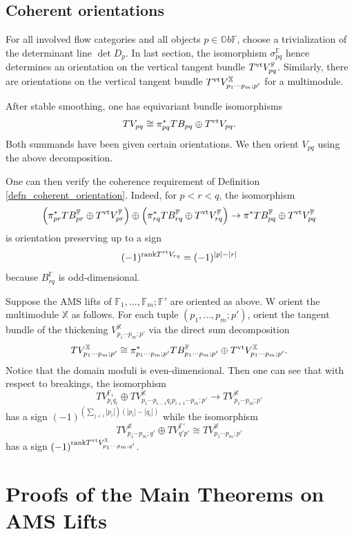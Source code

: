 \documentclass[reqno, 10pt]{amsart}
\numberwithin{equation}{section}
\numberwithin{equation}{section}
\theoremstyle{definition}
\theoremstyle{remark}
\newcommand{\beqn}{\begin{equation*}}
\newcommand{\eeqn}{\end{equation*}}
\newcommand{\mb}{\mathbb}
\begin{document}
\subsection{Coherent orientations}

For all involved flow categories and all objects $p \in {\mb Ob}{\mb F}$, choose a trivialization of the determinant line $\det D_p$. In last section, the isomorphism $\sigma_{pq}^{\mb F}$ hence determines an orientation on the vertical tangent bundle $T^{\rm vt} V_{pq}^{\mb F}$. Similarly, there are orientations on the vertical tangent bundle $T^{\rm vt} V_{p_1\cdots p_m; p'}^{\mb X}$ for a multimodule. 

After stable smoothing, one has equivariant bundle isomorphisms
\beqn
TV_{pq} \cong \pi_{pq}^* TB_{pq} \oplus T^{\rm vt} V_{pq}.
\eeqn
Both summands have been given certain orientations. We then orient $V_{pq}$ using the above decomposition. 


One can then verify the coherence requirement of Definition \ref{defn_coherent_orientation}. Indeed, for $p<r<q$, the isomorphism
\beqn
\Big( \pi_{pr}^* TB_{pr}^{\mb F} \oplus T^{\rm vt} V_{pr}^{\mb F} \Big) \oplus \Big( \pi_{rq}^* T B_{rq}^{\mb F} \oplus T^{\rm vt} V_{rq}^{\mb F} \Big) \to \pi^* TB_{pq}^{\mb F} \oplus T^{\rm vt} V_{pq}^{\mb F}
\eeqn
is orientation preserving up to a sign
\beqn
(-1)^{{\rm rank} T^{\rm vt} V_{rq}} = (-1)^{|p| - |r|}
\eeqn
because $B_{rq}^{\mb F}$ is odd-dimensional.


Suppose the AMS lifts of ${\mb F}_1, \ldots, {\mb F}_m; {\mb F}'$ are oriented as above. W orient the multimodule ${\mb X}$ as follows. For each tuple $(p_1, \ldots, p_m; p')$, orient the tangent bundle of the thickening $V_{p_1 \cdots p_m; p'}^{\mb X}$ via the direct sum decomposition
\beqn
TV_{p_1 \cdots p_m;p'}^{\mb X} \cong \pi_{p_1 \cdots p_m; p'}^* TB_{p_1\cdots p_m; p'}^{\mb F} \oplus T^{\rm vt} V_{p_1 \cdots p_m; p'}^{\mb X}.
\eeqn
Notice that the domain moduli is even-dimensional. Then one can see that with respect to breakings, the isomorphism
\beqn
TV_{p_i q_i}^{{\mb F}_i} \oplus TV_{p_1 \cdots p_{i-1} q_i p_{i+1} \cdots p_m; p'}^{\mb X} \to TV_{p_1 \cdots p_m; p'}^{\mb X}
\eeqn
has a sign $(-1)^{(\sum_{j<i} |p_i|)(|p_i|- |q_i|)}$ while the isomorphism
\beqn
T V_{p_1 \cdots p_m; q'}^{\mb X} \oplus TV_{q'p'}^{{\mb F}'} \cong TV_{p_1 \cdots p_m; p'}^{\mb X}
\eeqn
has a sign $(-1)^{{\rm rank} T^{\rm vt} V_{p_1\cdots p_m; q'}^{\mb X}}$. 



\section{Proofs of the Main Theorems on AMS Lifts}\label{section_AMS_proofs}
\end{document}
